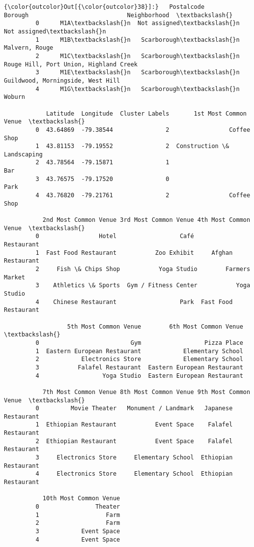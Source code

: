 \documentclass[11pt]{article}
\begin{document}
\begin{Verbatim}[commandchars=\\\{\}]
{\color{outcolor}Out[{\color{outcolor}38}]:}   Postalcode         Borough                            Neighborhood  \textbackslash{}
         0      M1A\textbackslash{}n  Not assigned\textbackslash{}n                          Not assigned\textbackslash{}n   
         1      M1B\textbackslash{}n   Scarborough\textbackslash{}n                          Malvern, Rouge   
         2      M1C\textbackslash{}n   Scarborough\textbackslash{}n  Rouge Hill, Port Union, Highland Creek   
         3      M1E\textbackslash{}n   Scarborough\textbackslash{}n       Guildwood, Morningside, West Hill   
         4      M1G\textbackslash{}n   Scarborough\textbackslash{}n                                  Woburn   
         
            Latitude  Longitude  Cluster Labels       1st Most Common Venue  \textbackslash{}
         0  43.64869  -79.38544               2                 Coffee Shop   
         1  43.81153  -79.19552               2  Construction \& Landscaping   
         2  43.78564  -79.15871               1                         Bar   
         3  43.76575  -79.17520               0                        Park   
         4  43.76820  -79.21761               2                 Coffee Shop   
         
           2nd Most Common Venue 3rd Most Common Venue 4th Most Common Venue  \textbackslash{}
         0                 Hotel                  Café            Restaurant   
         1  Fast Food Restaurant           Zoo Exhibit     Afghan Restaurant   
         2     Fish \& Chips Shop           Yoga Studio        Farmers Market   
         3    Athletics \& Sports  Gym / Fitness Center           Yoga Studio   
         4    Chinese Restaurant                  Park  Fast Food Restaurant   
         
                  5th Most Common Venue        6th Most Common Venue  \textbackslash{}
         0                          Gym                  Pizza Place   
         1  Eastern European Restaurant            Elementary School   
         2            Electronics Store            Elementary School   
         3           Falafel Restaurant  Eastern European Restaurant   
         4                  Yoga Studio  Eastern European Restaurant   
         
           7th Most Common Venue 8th Most Common Venue 9th Most Common Venue  \textbackslash{}
         0         Movie Theater   Monument / Landmark   Japanese Restaurant   
         1  Ethiopian Restaurant           Event Space    Falafel Restaurant   
         2  Ethiopian Restaurant           Event Space    Falafel Restaurant   
         3     Electronics Store     Elementary School  Ethiopian Restaurant   
         4     Electronics Store     Elementary School  Ethiopian Restaurant   
         
           10th Most Common Venue  
         0                Theater  
         1                   Farm  
         2                   Farm  
         3            Event Space  
         4            Event Space  
\end{Verbatim}
            
\end{document}
